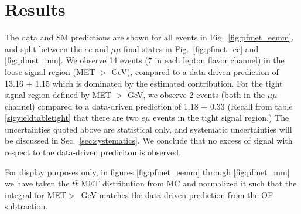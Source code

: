 
\section{Results}
\label{sec:results}

The data and SM predictions are shown for all events in 
Fig.~\ref{fig:pfmet_eemm}, 
and split between the $ee$
and $\mu\mu$ final states in 
Fig.~\ref{fig:pfmet_ee} and \ref{fig:pfmet_mm}. 
We observe 14 events (7 in each lepton flavor channel) 
in the loose signal region (MET $>$ \signalmetl GeV), 
compared to a data-driven prediction of 
13.16  $\pm$  1.15
which is dominated by the estimated \ttbar contribution. 
For the tight signal region defined by MET $>$ \signalmett GeV, 
we observe 2 events (both in the $\mu\mu$ channel) compared to a 
data-driven prediction of 
1.18  $\pm$  0.33
(Recall from table \ref{sigyieldtabletight} that there are two $e\mu$ events in 
the tight signal region.)
The uncertainties quoted above are statistical only, and systematic uncertainties will be 
discussed in Sec.~\ref{sec:systematics}. We conclude that no excess of signal 
with respect to the data-driven prediciton is observed.

For display purposes only, in figures \ref{fig:pfmet_eemm} through \ref{fig:pfmet_mm} we have 
taken the
$t\bar{t}$ MET distribution from MC and normalized it such that the integral for 
MET$>$\signalmetl~GeV matches the data-driven prediction
from the OF subtraction. 



\newcommand{\resulttitle}
{                        &   MET $>30$  GeV    &   MET $>60$  GeV    &   MET $>100$ GeV    &   MET $>200$ GeV \\}

